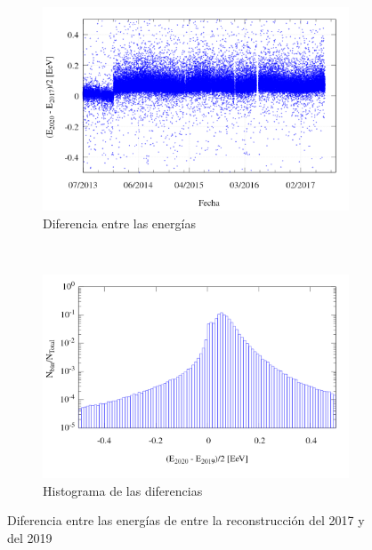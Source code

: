         \begin{figure}[H]
          \centering
            \begin{subfigure}[b]{0.65\textwidth}
              \centering
              \includegraphics[width=\linewidth]{../0_Introduccion/comparacion_deltaE.png}
              \caption{Diferencia entre las energías} \label{fig:deltaE}
            \end{subfigure}\\
            \begin{subfigure}[b]{0.65\textwidth}
              \centering
              \includegraphics[width=\linewidth]{../0_Introduccion/histograma_deltaE.png}
              \caption{Histograma de las diferencias}   \label{fig:histograma}
            \end{subfigure}
           \caption{Diferencia entre las energías de entre la reconstrucción del 2017 y del 2019}
         \end{figure}

